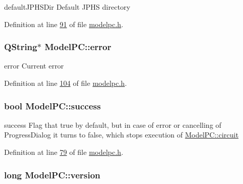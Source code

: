 default\-J\-P\-H\-S\-Dir Default J\-P\-H\-S directory 



Definition at line \hyperlink{modelpc_8h_source_l00091}{91} of file \hyperlink{modelpc_8h_source}{modelpc.\-h}.

\hypertarget{class_model_p_c_a4e5a9c0ca1f06fe5bc478b6bf248c37c}{
\subsubsection[{error}]{\setlength{\rightskip}{0pt plus 5cm}Q\-String$\ast$ Model\-P\-C\-::error\hspace{0.3cm}{\ttfamily [protected]}}}\label{class_model_p_c_a4e5a9c0ca1f06fe5bc478b6bf248c37c}


error Current error 



Definition at line \hyperlink{modelpc_8h_source_l00104}{104} of file \hyperlink{modelpc_8h_source}{modelpc.\-h}.

\hypertarget{class_model_p_c_a945ffbbc44a832b953c191debd448f4c}{
\subsubsection[{success}]{\setlength{\rightskip}{0pt plus 5cm}bool Model\-P\-C\-::success}}\label{class_model_p_c_a945ffbbc44a832b953c191debd448f4c}


success Flag that true by default, but in case of error or cancelling of Progress\-Dialog it turns to false, which stops execution of \hyperlink{class_model_p_c_a1d0091062a0c836b283ec2f67411623b}{Model\-P\-C\-::circuit} 



Definition at line \hyperlink{modelpc_8h_source_l00079}{79} of file \hyperlink{modelpc_8h_source}{modelpc.\-h}.

\hypertarget{class_model_p_c_a5af48ab89e19be42a94c34ba00249401}{
\subsubsection[{version}]{\setlength{\rightskip}{0pt plus 5cm}long Model\-P\-C\-::version}}\label{class_model_p_c_a5af48ab89e19be42a94c34ba00249401}



